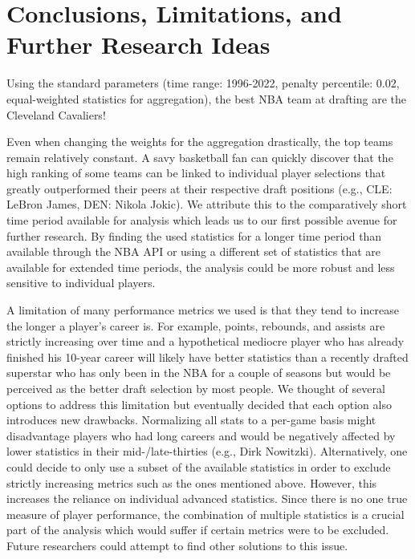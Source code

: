 \documentclass[12pt]{article}
\begin{document}
\newpage

\section{Conclusions, Limitations, and Further Research Ideas}
Using the standard parameters (time range: 1996-2022, penalty percentile: 0.02, equal-weighted statistics for aggregation), the best NBA team at drafting are the Cleveland Cavaliers!

Even when changing the weights for the aggregation drastically, the top teams remain relatively constant. A savy basketball fan can quickly discover that the high ranking of some teams can be linked to individual player selections that greatly outperformed their peers at their respective draft positions (e.g., CLE: LeBron James, DEN: Nikola Jokic). We attribute this to the comparatively short time period available for analysis which leads us to our first possible avenue for further research. By finding the used statistics for a longer time period than available through the NBA API or using a different set of statistics that are available for extended time periods, the analysis could be more robust and less sensitive to individual players.

A limitation of many performance metrics we used is that they tend to increase the longer a player's career is. For example, points, rebounds, and assists are strictly increasing over time and a hypothetical mediocre player who has already finished his 10-year career will likely have better statistics than a recently drafted superstar who has only been in the NBA for a couple of seasons but would be perceived as the better draft selection by most people. We thought of several options to address this limitation but eventually decided that each option also introduces new drawbacks. Normalizing all stats to a per-game basis might disadvantage players who had long careers and would be negatively affected by lower statistics in their mid-/late-thirties (e.g., Dirk Nowitzki). Alternatively, one could decide to only use a subset of the available statistics in order to exclude strictly increasing metrics such as the ones mentioned above. However, this increases the reliance on individual advanced statistics. Since there is no one true measure of player performance, the combination of multiple statistics is a crucial part of the analysis which would suffer if certain metrics were to be excluded. Future researchers could attempt to find other solutions to this issue.
\end{document}
